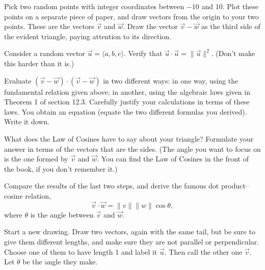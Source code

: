 \documentclass[12pt]{exam}
\theoremstyle{definition}
\begin{document}
\begin{questions}

\question Pick two random points with integer coordinates between $-10$ and $10$. Plot these points on a separate piece of paper, and draw vectors from the origin to your two points. These are the vectors $\vec{v}$ and $\vec{w}$. Draw the vector $\vec{v} - \vec{w}$ as the third side of the evident triangle, paying attention to its direction.


\question Consider a random vector $\vec{u} = \langle a, b, c \rangle$. Verify that $\vec{u} \cdot \vec{u} = \lVert \vec{u} \rVert^2$. (Don't make this harder than it is.)




\question Evaluate $(\vec{v} - \vec{w}) \cdot (\vec{v} - \vec{w})$ in two different ways: in one way, using the fundamental relation given above; in another, using the algebraic laws given in Theorem 1 of section 12.3. Carefully justify your calculations in terms of these laws. You obtain an equation (equate the two different formulas you derived). Write it down.


\question What does the Law of Cosines have to say about your triangle? Formulate your answer in terms of the vectors that are the sides. (The angle you want to focus on is the one formed by $\vec{v}$ and $\vec{w}$. You can find the Law of Cosines in the front of the book, if you don't remember it.)


\question Compare the results of the last two steps, and derive the famous dot product--cosine relation,
$$ \vec{v} \cdot \vec{w} = \lVert v \rVert \lVert w \rVert \cos{\theta},$$
where $\theta$ is the angle between $\vec{v}$ and $\vec{w}$.


\newpage


\question Start a new drawing. Draw two vectors, again with the same tail, but be sure to give them different lengths, and make sure they are not parallel or perpendicular. Choose one of them to have length 1 and label it $\vec{u}$. Then call the other one $\vec{v}$. Let $\theta$ be the angle they make.


\end{questions}
\end{document}
